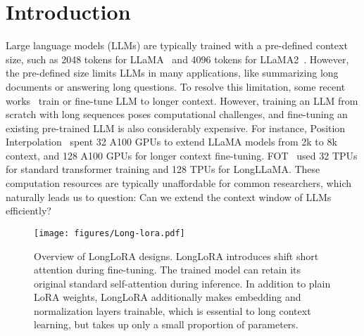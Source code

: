 \documentclass{article} %
\begin{document}
\section{Introduction}
Large language models (LLMs) are typically trained with a pre-defined context size, such as 2048 tokens for LLaMA~\citep{llama} and 4096 tokens for LLaMA2~\citep{llama2}. However, the pre-defined size limits LLMs in many applications, like summarizing long documents or answering long questions. To resolve this limitation, some recent works~\citep{position-interpolation,focused-transformer,landmark-attention} train or fine-tune LLM to longer context. However, training an LLM from scratch with long sequences poses computational challenges, and fine-tuning an existing pre-trained LLM is also considerably expensive.
For instance, Position Interpolation~\citep{position-interpolation} spent 32 A100 GPUs to extend LLaMA models from 2k to 8k context, and 128 A100 GPUs for longer context fine-tuning. FOT~\citep{focused-transformer} used 32 TPUs for standard transformer training and 128 TPUs for LongLLaMA. These computation resources are typically unaffordable for common researchers, which naturally leads us to question: Can we extend the context window of LLMs efficiently?

\begin{figure*}[t]
\begin{center}
\texttt{[image: figures/Long-lora.pdf]}
\end{center}
\caption{Overview of LongLoRA designs. LongLoRA introduces shift short attention during fine-tuning. The trained model can retain its original standard self-attention during inference. In addition to plain LoRA weights, LongLoRA additionally makes embedding and normalization layers trainable, which is essential to long context learning, but takes up only a small proportion of parameters. %
}
\label{fig:long-lora}
\end{figure*}
\end{document}

